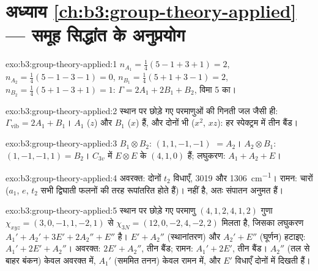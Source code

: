 \section*{अध्याय \ref{ch:b3:group-theory-applied} --- समूह सिद्धांत के अनुप्रयोग}

\begin{solution}{exo:b3:group-theory-applied:1}
$n_{A_1} = \frac14(5 - 1 + 3 + 1) = 2$, $n_{A_2} = \frac14(5 - 1 - 3 - 1) = 0$,
$n_{B_1} = \frac14(5 + 1 + 3 - 1) = 2$, $n_{B_2} = \frac14(5 + 1 - 3 + 1) = 1$:
$\Gamma = 2A_1 + 2B_1 + B_2$, विमा 5 का।
\end{solution}

\begin{solution}{exo:b3:group-theory-applied:2}
स्थान पर छोड़े गए परमाणुओं की गिनती जल जैसी ही: $\Gamma_{\mathrm{vib}} = 2A_1 + B_1$। $A_1$ ($z$) और
$B_1$ ($x$)  हैं, और दोनों  भी ($x^2$, $xz$): हर स्पेक्ट्रम में तीन
बैंड।
\end{solution}

\begin{solution}{exo:b3:group-theory-applied:3}
$B_1\otimes B_2$:  $(1, 1, -1, -1)$ $= A_2$। $A_2\otimes B_1$: $(1, -1, -1,
1) = B_2$। $C_{3v}$ में $E\otimes E$ के  $(4, 1, 0)$ हैं; लघुकरण: $A_1 + A_2 +
E$।
\end{solution}

\begin{solution}{exo:b3:group-theory-applied:4}
अवरक्त: दोनों $t_2$ विधाएँ, 3019 और \qty{1306}{cm^{-1}}। रामन: चारों ($a_1$,
$e$, $t_2$ सभी द्विघाती फलनों की तरह रूपांतरित होते हैं)।  नहीं है, अतः
संपातन अनुमत हैं।
\end{solution}

\begin{solution}{exo:b3:group-theory-applied:5}
स्थान पर छोड़े गए परमाणु $(4, 1, 2, 4, 1, 2)$ गुणा $\chi_{xyz} = (3, 0, -1, 1, -2, 1)$ से
$\chi_{3N} = (12, 0, -2, 4, -2, 2)$ मिलता है, जिसका लघुकरण $A_1' + A_2' + 3E' + 2A_2'' +
E''$ है। $E' + A_2''$ (स्थानांतरण) और $A_2' + E''$ (घूर्णन) हटाइए: $A_1' + 2E'
+ A_2''$। अवरक्त: $2E' + A_2''$, तीन बैंड; रामन: $A_1' + 2E'$, तीन बैंड। $A_2''$
(तल से बाहर बंकन) केवल अवरक्त में, $A_1'$ (सममित तनन) केवल रामन में, और $E'$
विधाएँ दोनों में दिखती हैं।
\end{solution}

